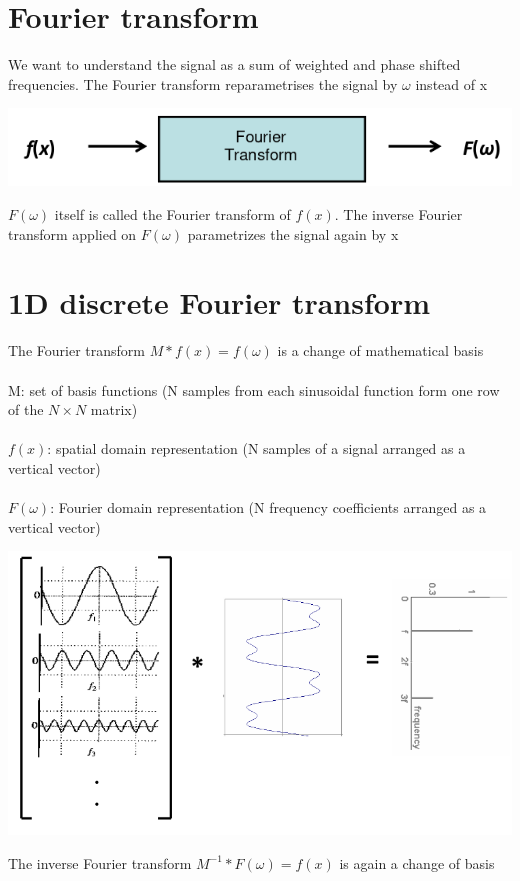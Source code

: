 \documentclass{article}[18pt]
\begin{document}
\section{Fourier transform}
We want to understand the signal as a sum of weighted and phase shifted frequencies. The Fourier transform reparametrises the signal by $\omega$ instead of x
\begin{center}
	\includegraphics[scale=0.7]{"fourier transform"}
\end{center}
$F(\omega)$ itself is called the Fourier transform of $f(x)$. The inverse Fourier transform applied on $F(\omega)$ parametrizes the signal again by x
\section{1D discrete Fourier transform}
The Fourier transform $M * f(x)=f(\omega)$ is a change of mathematical basis\\
\\
M: set of basis functions (N samples from each sinusoidal function form one row of the $N\times N$ matrix)\\
\\
$f(x)$: spatial domain representation (N samples of a signal arranged as a vertical vector)\\
\\
$F(\omega)$: Fourier domain representation (N frequency coefficients arranged as a vertical vector)
\begin{center}
	\includegraphics[scale=0.7]{"1D Discrete Fourier"}
\end{center}
The inverse Fourier transform $M^{-1}*F(\omega)=f(x)$ is again a change of basis
\end{document}

